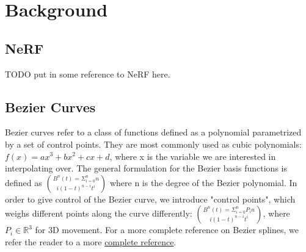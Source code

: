 \section{Background}

\subsection{NeRF}

TODO put in some reference to NeRF here.

\subsection{Bezier Curves}

Bezier curves refer to a class of functions defined as a polynomial parametrized by a set of
control points. They are most commonly used as cubic polynomials: $f(x) = ax^3 + bx^2 + cx + d$,
where x is the variable we are interested in interpolating over. The general formulation for
the Bezier basis functions is defined as $B^n(t) = \Sigma^n_{i=0} {n}\choose{i} (1-t)^{n-i} t^i$ where n
is the degree of the Bezier polynomial. In order to give control of the Bezier curve, we
introduce "control points", which weighs different points along the curve differently:
$B^n(t) = \Sigma^n_{i=0} P_i {n}\choose{i} (1-t)^{n-i} t^i$, where $P_i\in\mathbb{R}^3$ for 3D
movement. For a more complete reference on Bezier splines, we refer the reader to a more
\href{https://pomax.github.io/bezierinfo/index.html}{complete reference}.


